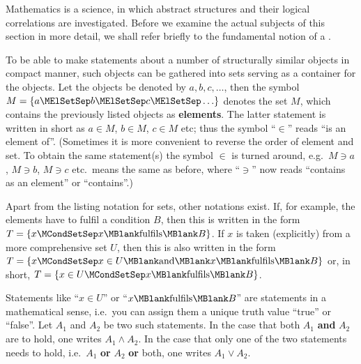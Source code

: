 \begin{MIntro}

Mathematics is a science, in which abstract structures and their logical correlations are investigated. 
Before we examine the actual subjects of this section in more detail, we shall refer briefly to the fundamental 
notion of a . 

\begin{MInfo}
To be able to make statements about a number of structurally similar objects in compact manner, such objects 
can be gathered into sets serving as a container for the objects. Let the objects be denoted by $a,b,c,\ldots$, 
then the symbol $M=\{a\MElSetSep b \MElSetSep c \MElSetSep \ldots\}$ denotes the set $M$, which contains the previously 
listed objects as \textbf{elements}. The latter statement is written in short as $a\in M$, $b\in M$, $c\in M$ etc; thus the symbol 
``$\in$'' reads ``is an element of''. (Sometimes it is more convenient to reverse the order of element 
and set. To obtain the same statement(s) the symbol $\in$ is turned around, e.g.\ $M\ni a$, $M\ni b$, $M\ni c$ etc.\ 
means the same as before, where ``$\ni$'' now reads ``contains as an element'' or 
``contains''.) 

Apart from the listing notation for sets, other notations exist. If, for example, the elements have to fulfil a 
condition $B$, then this is written in the form $T=\{x\MCondSetSep x\MBlank\text{fulfils}\MBlank B\}$. If $x$ is taken (explicitly) from a 
more comprehensive set $U$, then this is also written in the form $T=\{x\MCondSetSep x\in U \MBlank\text{and}\MBlank 
x\MBlank\text{fulfils}\MBlank B\}$ or, in short, $T=\{x\in U\MCondSetSep x\MBlank\text{fulfils}\MBlank B\}$.

Statements like ``$x\in U$'' or ``$x\MBlank\text{fulfils}\MBlank B$'' are statements in a 
mathematical sense, i.e.\ you can assign them a unique truth value ``true'' or ``false''. 
Let $A_1$ and $A_2$ be two such statements. In the case that both $A_1$ \textbf{and} $A_2$ are to hold, one writes $A_1 \wedge A_2$. In the case that only one of the two 
statements needs to hold, i.e.\ $A_1$ \textbf{or} $A_2$ \textbf{or} both, one writes $A_1\vee A_2$.


\end{MInfo}
\end{MIntro}
